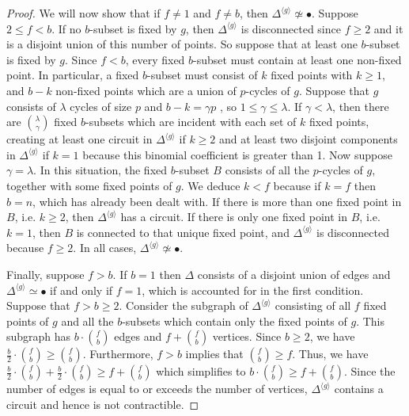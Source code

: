 \documentclass[12pt]{amsart}
\theoremstyle{plain}
\theoremstyle{definition}
\theoremstyle{remark}
\numberwithin{equation}{section}
\begin{document}
\begin{proof}
    We will now show that if $f\ne 1$ and $f\ne b$, then $\Delta^{\langle g\rangle}\not\simeq\bullet$. Suppose $2\leq f<b$. If no $b$-subset is fixed by $g$, then $\Delta^{\langle g\rangle}$ is disconnected since $f\geq2$ and it is a disjoint union of this number of points. So suppose that at least one $b$-subset is fixed by $g$. Since $f<b$, every fixed $b$-subset must contain at least one non-fixed point. In particular, a fixed $b$-subset must consist of $k$ fixed points with $k\ge 1$, and $b-k$ non-fixed points which are a union of $p$-cycles of $g$. Suppose that $g$ consists of $\lambda$ cycles of size $p$ and $b-k=\gamma p$ , so $1\le\gamma\le \lambda$. If $\gamma<\lambda$, then there are $\binom{\lambda}{\gamma}$ fixed $b$-subsets which are incident with each set of $k$ fixed points, creating at least one circuit in $\Delta^{\langle g\rangle}$ if $k\geq 2$ and at least two disjoint components in $\Delta^{\langle g\rangle}$ if $k=1$ because this binomial coefficient is greater than 1. Now suppose $\gamma=\lambda$. In this situation, the fixed $b$-subset $B$ consists of all the $p$-cycles of $g$, together with some fixed points of $g$. We deduce $k<f$ because if $k=f$ then $b=n$, which has already been dealt with. If there is more than one fixed point in $B$, i.e. $k\ge 2$, then $\Delta^{\langle g\rangle}$ has a circuit. If there is only one fixed point in $B$, i.e. $k=1$, then $B$ is connected to that unique fixed point, and $\Delta^{\langle g\rangle}$ is disconnected because $f\ge 2$. In all cases, $\Delta^{\langle g\rangle}\not\simeq\bullet$.

    Finally, suppose $f>b$. If $b=1$ then $\Delta$ consists of a disjoint union of edges and $\Delta^{\langle g\rangle}\simeq \bullet$ if and only if $f=1$, which is accounted for in the first condition. Suppose that $f>b\geq2$.  Consider the subgraph of $\Delta^{\langle g\rangle}$ consisting of all $f$ fixed points of $g$ and all the $b$-subsets which contain only the fixed points of $g$. This subgraph has $b\cdot\binom{f}{b}$ edges and $f+\binom{f}{b}$ vertices. Since $b\geq2$, we have $\frac{b}{2}\cdot\binom{f}{b}\geq\binom{f}{b}$. Furthermore, $f>b$ implies that $\binom{f}{b}\geq f$. Thus, we have $\frac{b}{2}\cdot\binom{f}{b}+\frac{b}{2}\cdot\binom{f}{b}\geq f+\binom{f}{b}$ which simplifies to $b\cdot\binom{f}{b}\geq f+\binom{f}{b}$. Since the number of edges is equal to or exceeds the number of vertices, $\Delta^{\langle g\rangle}$ contains a circuit and hence is not contractible.
\end{proof} 
\end{document}
